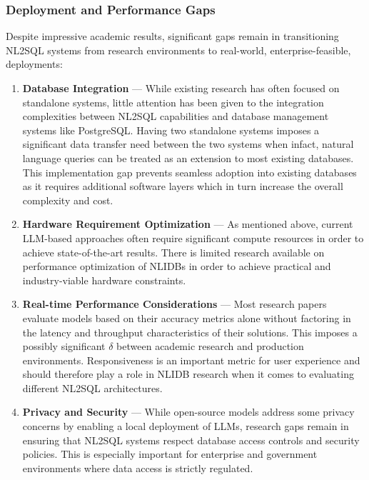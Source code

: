 \subsubsection{Deployment and Performance Gaps}

Despite impressive academic results, significant gaps remain in transitioning NL2SQL systems from research environments
to real-world, enterprise-feasible, deployments:

\begin{enumerate}
    \item \textbf{Database Integration} — While existing research has often focused on standalone systems, little attention
          has been given to the integration complexities between NL2SQL capabilities and database management systems like 
          PostgreSQL. Having two standalone systems imposes a significant data transfer need between the two systems when infact, 
          natural language queries can be treated as an extension to most existing databases. This implementation gap prevents 
          seamless adoption into existing databases as it requires additional software layers which in turn increase the overall 
          complexity and cost.
    \item \textbf{Hardware Requirement Optimization} — As mentioned above, current LLM-based approaches often require significant
          compute resources in order to achieve state-of-the-art results. There is limited research available on performance 
          optimization of NLIDBs in order to achieve practical and industry-viable hardware constraints.
    \item \textbf{Real-time Performance Considerations} — Most research papers evaluate models based on their accuracy metrics 
          alone without factoring in the latency and throughput characteristics of their solutions. This imposes a possibly 
          significant $\delta$ between academic research and production environments. Responsiveness is an important metric for 
          user experience and should therefore play a role in NLIDB research when it comes to evaluating different NL2SQL 
          architectures.
    \item \textbf{Privacy and Security} — While open-source models address some privacy concerns by enabling a local deployment of 
          LLMs, research gaps remain in ensuring that NL2SQL systems respect database access controls and security policies. This 
          is especially important for enterprise and government environments where data access is strictly regulated.
\end{enumerate}

